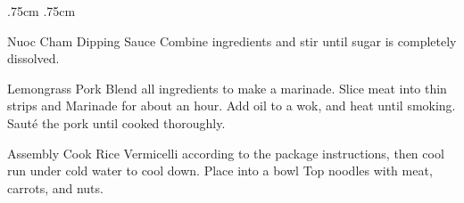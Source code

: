 \documentclass[]{article}
\title{}
\author{}
\begin{document}
\RecipeWidths{\textwidth}{3cm}{0.5cm}{5cm} {.75cm} {.75cm}

\begin{recipe}{Nuoc Cham Dipping Sauce}{}{}	
	Combine ingredients and stir until sugar is completely dissolved.
\end{recipe}

\begin{recipe}{Lemongrass Pork}{}{}	
	Blend all ingredients to make a marinade. 
	Slice meat into thin strips and Marinade for about an hour. 
	Add oil to a wok, and heat until smoking. Sauté the pork until cooked thoroughly. 
\end{recipe}

\begin{recipe}{Assembly}{}{}	
	Cook Rice Vermicelli according to the package instructions, then cool run under cold water to cool down. Place into a bowl
	Top noodles with meat, carrots, and nuts. 
\end{recipe}
\end{document}
